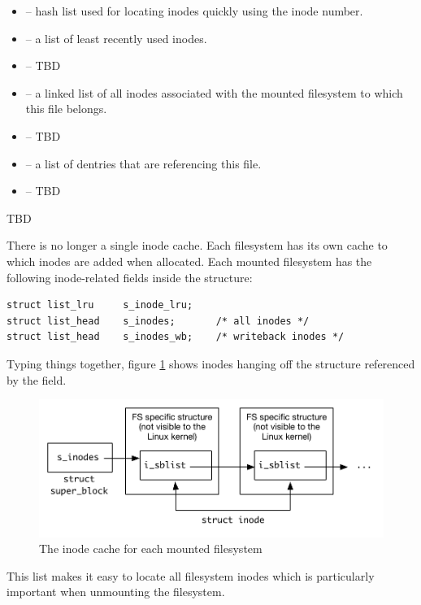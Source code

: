 \begin{itemize}
	\item {} -- hash list used for locating inodes quickly using the inode number. 
	\item {} -- a list of least recently used inodes.
	\item {} -- TBD	
	\item {} -- a linked list of all inodes associated with the mounted filesystem to which this file belongs.
	\item {} -- TBD
	\item {} -- a list of dentries that are referencing this file. 
	\item {} -- TBD
\end{itemize}

\noindent
TBD

There is no longer a single inode cache. Each filesystem has its own cache to which inodes are added when allocated. Each mounted filesystem has the following inode-related fields inside the  structure:

\begin{lstlisting}
struct list_lru     s_inode_lru;
struct list_head    s_inodes;       /* all inodes */
struct list_head    s_inodes_wb;    /* writeback inodes */
\end{lstlisting}

\noindent
Typing things together, figure \ref{fig:kstruct-inodes} shows inodes hanging off the  structure referenced by the  field.

\begin{figure}[h]
	\includegraphics[scale=0.6]{figures/kstruct-inodes.pdf}
	\centering
	\caption{The inode cache for each mounted filesystem}
	\label{fig:kstruct-inodes}
\end{figure}

\noindent
This list makes it easy to locate all filesystem inodes which is particularly important when unmounting the filesystem.

